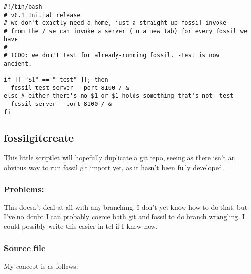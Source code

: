 \documentclass[11pt]{article}
\begin{document}
\begin{verbatim}
#!/bin/bash
# v0.1 Initial release
# we don't exactly need a home, just a straight up fossil invoke
# from the / we can invoke a server (in a new tab) for every fossil we have
#
# TODO: we don't test for already-running fossil. -test is now ancient.

if [[ "$1" == "-test" ]]; then
  fossil-test server --port 8100 / &
else # either there's no $1 or $1 holds something that's not -test
  fossil server --port 8100 / &
fi
\end{verbatim}

\subsection*{fossilgitcreate}
\label{sec:org5396787}
This little scriptlet will hopefully duplicate a git repo, seeing as there isn't an obvious way
to run fossil git import yet, as it hasn't been fully developed.
\subsubsection*{Problems:}
\label{sec:org539548a}
This doesn't deal at all with any branching. I don't yet know how to do that, but I've no doubt I can
probably coerce both git and fossil to do branch wrangling.
I could possibly write this easier in tcl if I knew how.
\subsubsection*{Source file}
\label{sec:org608d590}
My concept is as follows:
\end{document}

